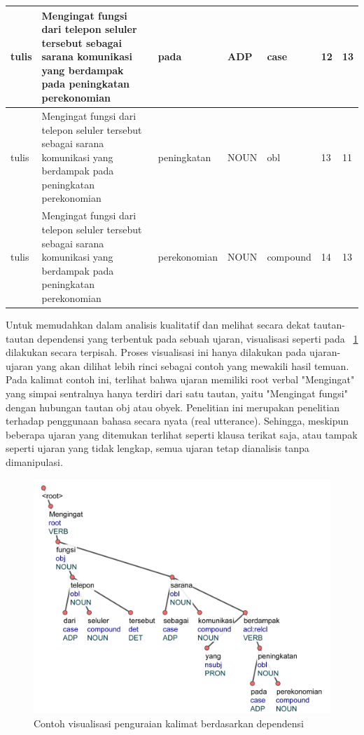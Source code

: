\begin{center}
\begin{table}
\begin{tiny}
\begin{tabulary}{1\textwidth}{| L | L | L | L | L | L | L |}
tulis & Mengingat fungsi dari telepon seluler tersebut sebagai sarana komunikasi yang berdampak pada peningkatan perekonomian & pada & ADP & case & 12 & 13 \\ \hline
tulis & Mengingat fungsi dari telepon seluler tersebut sebagai sarana komunikasi yang berdampak pada peningkatan perekonomian & peningkatan & NOUN & obl & 13 & 11 \\ \hline
tulis & Mengingat fungsi dari telepon seluler tersebut sebagai sarana komunikasi yang berdampak pada peningkatan perekonomian & perekonomian & NOUN & compound & 14 & 13 \\ 
\hline
  \end{tabulary}  
\end{tiny}
\end{table}
\end{center}

Untuk memudahkan dalam analisis kualitatif dan melihat secara dekat tautan-tautan dependensi yang terbentuk pada sebuah ujaran, visualisasi seperti pada \pic~\ref{fig:visualisasi_penguraian} dilakukan secara terpisah. Proses visualisasi ini hanya dilakukan pada ujaran-ujaran yang akan dilihat lebih rinci sebagai contoh yang mewakili hasil temuan. Pada kalimat contoh ini, terlihat bahwa ujaran memiliki root verbal "Mengingat" yang simpai sentralnya hanya terdiri dari satu tautan, yaitu "Mengingat fungsi" dengan hubungan tautan obj atau obyek. Penelitian ini merupakan penelitian terhadap penggunaan bahasa secara nyata (real utterance). Sehingga,  meskipun beberapa ujaran yang ditemukan terlihat seperti klausa terikat saja, atau tampak seperti ujaran yang tidak lengkap, semua ujaran tetap dianalisis tanpa dimanipulasi.

\begin{figure}
	\centering \includegraphics[width=1
	\textwidth] {pics/visualisasi_penguraian.jpg} 
	\caption{Contoh visualisasi penguraian kalimat berdasarkan dependensi} 
\label{fig:visualisasi_penguraian} \end{figure}

